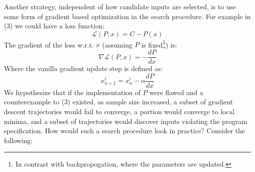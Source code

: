 \documentclass[12pt,initial,twoside,maitrise]{dms}
\numberwithin{equation}{section}
\numberwithin{table}{chapter}
\numberwithin{figure}{chapter}
\begin{document}
Another strategy, independent of how candidate inputs are selected, is to use some form of gradient based optimization in the search procedure. For example in (3) we could have a loss function:
%
\begin{equation}
    \mathcal{L}(P, x) = C - P(x)
\end{equation}
%
The gradient of the loss w.r.t. $x$ (assuming $P$ is fixed\footnote{In contrast with backpropogation, where the parameters are updated.}) is:
%
\begin{equation}
    \nabla \mathcal{L}(P, x) = - \frac{dP}{dx}
\end{equation}
%
Where the vanilla gradient update step is defined as:
%
\begin{equation}
    x_{n+1}^i=x_{n}^i - \alpha\frac{dP}{dx}
\end{equation}
%
We hypothesize that if the implementation of $P$ were flawed and a counterexample to (3) existed, as sample size increased, a subset of gradient descent trajectories would fail to converge, a portion would converge to local minima, and a subset of trajectories would discover inputs violating the program specification. How would such a search procedure look in practice? Consider the following:

%
%
\end{document}
